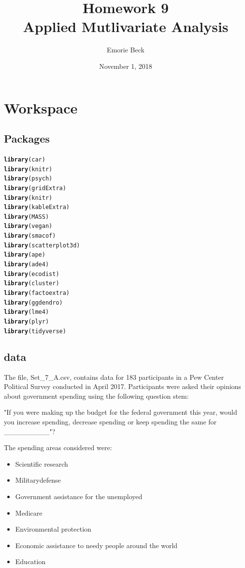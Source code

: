 \documentclass{article}\usepackage[]{graphicx}\usepackage[]{color}
\title{%
Homework 9\\
\large Applied Mutlivariate Analysis}
\date{November 1, 2018}
\author{Emorie Beck}
\makeatletter
\newcommand{\hlstd}[1]{\textcolor[rgb]{0.345,0.345,0.345}{#1}}%
\newcommand{\hlkwd}[1]{\textcolor[rgb]{0.737,0.353,0.396}{\textbf{#1}}}%
\newenvironment{kframe}{%
 \def\at@end@of@kframe{}%
 \ifinner\ifhmode%
  \def\at@end@of@kframe{\end{minipage}}%
  \begin{minipage}{\columnwidth}%
 \fi\fi%
 \def\FrameCommand##1{\hskip\@totalleftmargin \hskip-\fboxsep
 \colorbox{shadecolor}{##1}\hskip-\fboxsep
     \hskip-\linewidth \hskip-\@totalleftmargin \hskip\columnwidth}%
 \MakeFramed {\advance\hsize-\width
   \@totalleftmargin\z@ \linewidth\hsize
   \@setminipage}}%
 {\par\unskip\endMakeFramed%
 \at@end@of@kframe}
\newenvironment{knitrout}{}{} %
\makeatother
\begin{document}
\maketitle

\section{Workspace}
\subsection{Packages}



\begin{knitrout}
\color{fgcolor}\begin{kframe}
\begin{alltt}
\hlkwd{library}\hlstd{(car)}
\hlkwd{library}\hlstd{(knitr)}
\hlkwd{library}\hlstd{(psych)}
\hlkwd{library}\hlstd{(gridExtra)}
\hlkwd{library}\hlstd{(knitr)}
\hlkwd{library}\hlstd{(kableExtra)}
\hlkwd{library}\hlstd{(MASS)}
\hlkwd{library}\hlstd{(vegan)}
\hlkwd{library}\hlstd{(smacof)}
\hlkwd{library}\hlstd{(scatterplot3d)}
\hlkwd{library}\hlstd{(ape)}
\hlkwd{library}\hlstd{(ade4)}
\hlkwd{library}\hlstd{(ecodist)}
\hlkwd{library}\hlstd{(cluster)}
\hlkwd{library}\hlstd{(factoextra)}
\hlkwd{library}\hlstd{(ggdendro)}
\hlkwd{library}\hlstd{(lme4)}
\hlkwd{library}\hlstd{(plyr)}
\hlkwd{library}\hlstd{(tidyverse)}
\end{alltt}
\end{kframe}
\end{knitrout}



\subsection{data}
The file, Set\_7\_A.csv, contains data for 183 participants in a Pew Center Political Survey conducted in April 2017. Participants were asked their opinions about government spending using the following question stem:  

"If you were making up the budget for the federal government this year, would you increase spending, decrease spending or keep  spending the same for \_\_\_\_\_\_\_\_\_"?

The spending areas considered were:
\begin{itemize}
\item Scientific research
\item Militarydefense
\item Government assistance for the unemployed
\item Medicare
\item Environmental protection
\item Economic assistance to needy people around the world
\item Education
\end{itemize}
\end{document}
